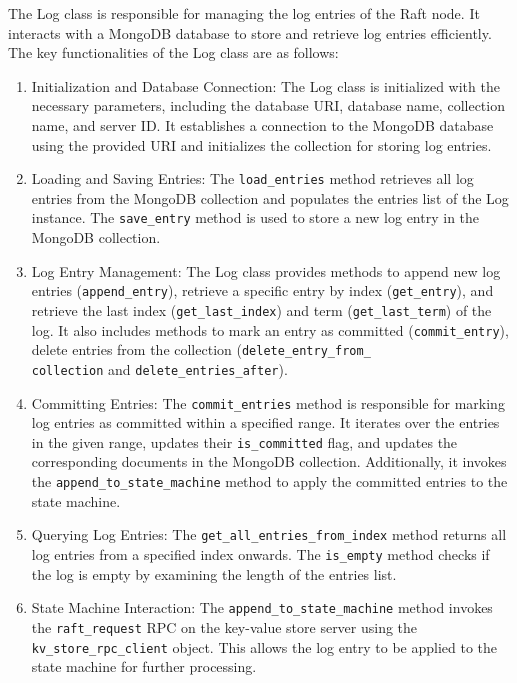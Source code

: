 \documentclass{article}
\begin{document}
The Log class is responsible for managing the log entries of the Raft node. It interacts with 
a MongoDB database to store and retrieve log entries efficiently. The key functionalities of 
the Log class are as follows:
\begin{enumerate}
    \item Initialization and Database Connection: The Log class is initialized with the 
    necessary parameters, including the database URI, database name, collection name, and 
    server ID. It establishes a connection to the MongoDB database using the provided URI and 
    initializes the collection for storing log entries.
    \item Loading and Saving Entries: The \texttt{load\_entries} method retrieves all log 
    entries from the MongoDB collection and populates the entries list of the Log instance. 
    The \texttt{save\_entry} method is used to store a new log entry in the MongoDB 
    collection.
    \item Log Entry Management: The Log class provides methods to append new log entries 
    (\texttt{append\_entry}), retrieve a specific entry by index (\texttt{get\_entry}), and 
    retrieve the last index (\texttt{get\_last\_index}) and term (\texttt{get\_last\_term}) of 
    the log. It also includes methods to mark an entry as committed (\texttt{commit\_entry}), 
    delete entries from the collection (\texttt{delete\_entry\_from\_\\collection} and 
    \texttt{delete\_entries\_after}).
    \item Committing Entries: The \texttt{commit\_entries} method is responsible for marking 
    log entries as committed within a specified range. It iterates over the entries in the 
    given range, updates their \texttt{is\_committed} flag, and updates the corresponding 
    documents in the MongoDB collection. Additionally, it invokes the 
    \texttt{append\_to\_state\_machine} method to apply the committed entries to the state 
    machine.
    \item Querying Log Entries: The \texttt{get\_all\_entries\_from\_index} method returns all 
    log entries from a specified index onwards. The \texttt{is\_empty} method checks if the 
    log is empty by examining the length of the entries list.
    \item State Machine Interaction: The \texttt{append\_to\_state\_machine} method invokes 
    the \texttt{raft\_request} RPC on the key-value store server using the 
    \texttt{kv\_store\_rpc\_client} object. This allows the log entry to be applied to the 
    state machine for further processing.
\end{enumerate}
\end{document}
